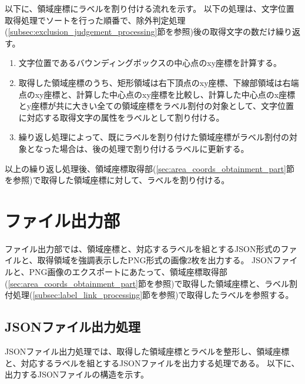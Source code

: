 以下に、領域座標にラベルを割り付ける流れを示す。
以下の処理は、文字位置取得処理でソートを行った順番で、除外判定処理(\ref{subsec:exclusion_judgement_processing}節を参照)後の取得文字の数だけ繰り返す。

\begin{enumerate}
    \item 文字位置であるバウンディングボックスの中心点のxy座標を計算する。
    \item 取得した領域座標のうち、矩形領域は右下頂点のxy座標、下線部領域は右端点のxy座標と、計算した中心点のxy座標を比較し、計算した中心点のx座標とy座標が共に大きい全ての領域座標をラベル割付の対象として、文字位置に対応する取得文字の属性をラベルとして割り付ける。
    \item 繰り返し処理によって、既にラベルを割り付けた領域座標がラベル割付の対象となった場合は、後の処理で割り付けるラベルに更新する。
\end{enumerate}

以上の繰り返し処理後、領域座標取得部(\ref{sec:area_coords_obtainment_part}節を参照)で取得した領域座標に対して、ラベルを割り付ける。

\section{ファイル出力部}\label{subsec:file_output_part}
ファイル出力部では、領域座標と、対応するラベルを組とするJSON形式のファイルと、取得領域を強調表示したPNG形式の画像2枚を出力する。
JSONファイルと、PNG画像のエクスポートにあたって、領域座標取得部(\ref{sec:area_coords_obtainment_part}節を参照)で取得した領域座標と、ラベル割付処理(\ref{subsec:label_link_processing}節を参照)で取得したラベルを参照する。


\subsection{JSONファイル出力処理}\label{subsec:json_file_output_processing}
JSONファイル出力処理では、取得した領域座標とラベルを整形し、領域座標と、対応するラベルを組とするJSONファイルを出力する処理である。
以下に、出力するJSONファイルの構造を示す。

